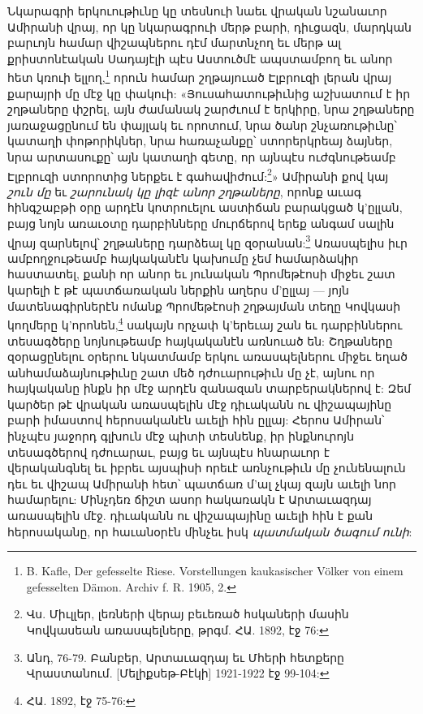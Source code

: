\documentclass{article}
\begin{document}
{Նկարագրի երկուութիւնը կը տեսնուի նաեւ վրական նշանաւոր Ամիրանի վրայ, որ կը նկարագրուի մերթ բարի, դիւցազն, մարդկան բարւոյն համար վիշապներու դէմ մարտնչող եւ մերթ ալ քրիստոնէական Սադայէլի պէս Աստուծմէ ապստամբող եւ անոր հետ կռուի ելլող,\footnote{B. Kafle, Der gefesselte Riese. Vorstellungen kaukasischer Völker von einem gefesselten Dämon. Archiv f. R. 1905, 2.} որուն համար շղթայուած Էլբրուզի լերան վրայ քարայրի մը մէջ կը փակուի: «Յուսահատութիւնից աշխատում է իր շղթաները փշրել, այն ժամանակ շարժւում է երկիրը, նրա շղթաները յառաջացընում են փայլակ եւ որոտում, նրա ծանր շնչառութիւնը՝ կատաղի փոթորիկներ, նրա հառաչանքը՝ ստորերկրեայ ձայներ, նրա արտասուքը՝ այն կատաղի գետը, որ այնպէս ուժգնութեամբ Էլբրուզի ստորոտից ներքեւ է գահավիժում:\footnote{Վս. Միւլլեր, լեռների վերայ բեւեռած հսկաների մասին Կովկասեան առասպելները, թրգմ. ՀԱ. 1892, էջ 76:}» Ամիրանի քով կայ \emph{շուն մը} եւ \emph{շարունակ կը լիզէ անոր շղթաները}, որոնք աւագ հինգշաբթի օրը արդէն կոտրուելու աստիճան բարակցած կ'ըլլան, բայց նոյն առաւօտը դարբինները մուրճերով երեք անգամ սալին վրայ զարնելով՝ շղթաները դարձեալ կը զօրանան:\footnote{Անդ, 76-79. Բանբեր, Արտաւազդայ եւ Մհերի հետքերը Վրաստանում. [Մելիքսեթ-Բէկի] 1921-1922 էջ 99-104:} Առասպելիս իւր ամբողջութեամբ հայկականէն կախումը չեմ համարձակիր հաստատել, քանի որ անոր եւ յունական Պրոմեթէոսի միջեւ շատ կարելի է թէ պատճառական ներքին աղերս մ'ըլլայ --- յոյն մատենագիրներէն ոմանք Պրոմեթէոսի շղթայման տեղը Կովկասի կողմերը կ'որոնեն,\footnote{ՀԱ. 1892, էջ 75-76:} սակայն որչափ կ'երեւայ շան եւ դարբիններու տեսագծերը նոյնութեամբ հայկականէն առնուած են: Շղթաները զօրացընելու օրերու նկատմամբ երկու առասպելներու միջեւ եղած անհամաձայնութիւնը շատ մեծ դժուարութիւն մը չէ, այնու որ հայկականը ինքն իր մէջ արդէն զանազան տարբերակներով է: Զեմ կարծեր թէ վրական առասպելին մէջ դիւականն ու վիշապայինը բարի իմաստով հերոսականէն աւելի հին ըլլայ: Հերոս Ամիրան՝ ինչպէս յաջորդ գլխուն մէջ պիտի տեսնենք, իր ինքնուրոյն տեսագծերով դժուարաւ, բայց եւ այնպէս հնարաւոր է վերականգնել եւ իբրեւ այսպիսի որեւէ առնչութիւն մը չունենալուն դեւ եւ վիշապ Ամիրանի հետ՝ պատճառ մ'ալ չկայ զայն աւելի նոր համարելու: Մինչդեռ ճիշտ ասոր հակառակն է Արտաւազդայ առասպելին մէջ. դիւականն ու վիշապայինը աւելի հին է քան հերոսականը, որ հաւանօրէն մինչեւ իսկ \emph{պատմական ծագում ունի}:

}
\end{document}
